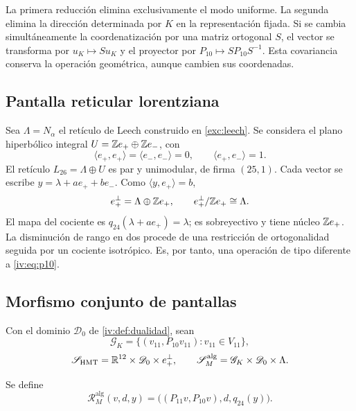 La primera reducción elimina exclusivamente el modo uniforme.
La segunda elimina la dirección determinada por \(K\) en
la representación fijada. Si se cambia simultáneamente la coordenatización
por una matriz ortogonal \(S\), el vector se transforma por
\(u_K\mapsto Su_K\) y el proyector por
\(P_{10}\mapsto SP_{10}S^{-1}\). Esta covariancia conserva
la operación geométrica, aunque cambien sus coordenadas.

\subsection{Pantalla reticular lorentziana}

Sea \(\Lambda=N_\alpha\) el retículo de Leech construido
en \ref{exc:leech}. Se considera el plano hiperbólico integral
\(U=\mathbb Z e_+\oplus\mathbb Z e_-\), con
\[
 \langle e_+,e_+\rangle=\langle e_-,e_-\rangle=0,
 \qquad\langle e_+,e_-\rangle=1.
\]
El retículo \(L_{26}=\Lambda\oplus U\) es par y
unimodular, de firma \((25,1)\). Cada vector se escribe
\(y=\lambda+ae_++be_-\). Como
\(\langle y,e_+\rangle=b\),
\begin{equation}
 e_+^\perp=\Lambda\oplus\mathbb Z e_+,
 \qquad e_+^\perp/\mathbb Z e_+\cong\Lambda.
 \label{iv:eq:26-24}
\end{equation}
El mapa del cociente es
\(q_{24}(\lambda+ae_+)=\lambda\); es sobreyectivo y tiene
núcleo \(\mathbb Z e_+\). La disminución de rango en dos procede
de una restricción de ortogonalidad seguida por un cociente
isotrópico. Es, por tanto, una operación de tipo diferente a
\eqref{iv:eq:p10}.

\begingroup\fontsize{10}{11.7}\selectfont
\setlength{\parskip}{2pt}\setlength{\abovedisplayskip}{5pt}\setlength{\belowdisplayskip}{5pt}
\subsection{Morfismo conjunto de pantallas}

Con el dominio \(\mathscr D_0\) de \ref{iv:def:dualidad},
sean
\[
 \mathscr G_K=\{(v_{11},P_{10}v_{11}):v_{11}\in V_{11}\},
\]
\[
 \mathscr S_{\mathrm{HMT}}=\mathbb R^{12}\times\mathscr D_0\times e_+^\perp,
 \qquad
 \mathscr S_M^{\mathrm{alg}}=\mathscr G_K\times\mathscr D_0\times\Lambda.
\]
\begin{definition}
\label{iv:def:rm-alg}
Se define
\begin{equation}
 \mathcal R_M^{\mathrm{alg}}(v,d,y)
 =\bigl((P_{11}v,P_{10}v),d,q_{24}(y)\bigr).
 \label{iv:eq:rm-alg}
\end{equation}
\end{definition}

